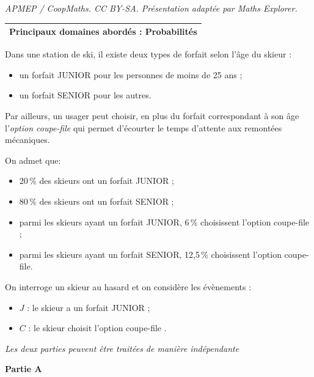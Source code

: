\documentclass[10pt]{article}
\begin{document}
\noindent\textit{APMEP / CoopMaths. CC BY-SA. Présentation adaptée par Maths Explorer.}\par\medskip
\medskip

\begin{tabularx}{\linewidth}{|X|}\hline
\textbf{Principaux domaines abordés :} Probabilités\\ \hline
\end{tabularx}

\medskip

Dans une station de ski, il existe deux types de forfait selon l'âge du skieur :

\begin{itemize}
\item un forfait JUNIOR pour les personnes de moins de 25 ans ;
\item un forfait SENIOR pour les autres.
\end{itemize}

Par ailleurs, un usager peut choisir, en plus du forfait correspondant à son âge l'\emph{option  coupe-file} qui permet d'écourter le temps d'attente aux remontées mécaniques.

On admet que:
\begin{itemize}
\item[$\bullet~~$] 20\,\% des skieurs ont un forfait JUNIOR ;
\item[$\bullet~~$] 80\,\% des skieurs ont un forfait SENIOR ;
\item[$\bullet~~$] parmi les skieurs ayant un forfait JUNIOR, 6\,\% choisissent l'option coupe-file ;
\item[$\bullet~~$] parmi les skieurs ayant un forfait SENIOR, 12,5\,\% choisissent l'option coupe-file.
\end{itemize}

On interroge un skieur au hasard et on considère les évènements :

\begin{itemize}
\item[$\bullet~~$] $J$ : \og le skieur a un forfait JUNIOR \fg ;
\item[$\bullet~~$] $C$ : \og le skieur choisit l'option coupe-file \fg.
\end{itemize}

\medskip

\emph{Les deux parties peuvent être traitées de manière indépendante}

\bigskip

\textbf{Partie A}

\medskip
\end{document}

